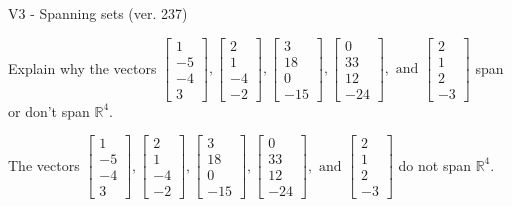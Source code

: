 \begin{exercise}
  \begin{exerciseTitle}V3 - Spanning sets (ver. 237)\end{exerciseTitle}
  \begin{exerciseStatement}
    Explain why the vectors \(\left[\begin{array}{r}
1 \\
-5 \\
-4 \\
3
\end{array}\right] , \left[\begin{array}{r}
2 \\
1 \\
-4 \\
-2
\end{array}\right] , \left[\begin{array}{r}
3 \\
18 \\
0 \\
-15
\end{array}\right] , \left[\begin{array}{r}
0 \\
33 \\
12 \\
-24
\end{array}\right] , \text{ and } \left[\begin{array}{r}
2 \\
1 \\
2 \\
-3
\end{array}\right]\) span or don't span \(\mathbb{R}^4\). 
	


  \end{exerciseStatement}
  \begin{exerciseAnswer}
   The vectors \(\left[\begin{array}{r}
1 \\
-5 \\
-4 \\
3
\end{array}\right] , \left[\begin{array}{r}
2 \\
1 \\
-4 \\
-2
\end{array}\right] , \left[\begin{array}{r}
3 \\
18 \\
0 \\
-15
\end{array}\right] , \left[\begin{array}{r}
0 \\
33 \\
12 \\
-24
\end{array}\right] , \text{ and } \left[\begin{array}{r}
2 \\
1 \\
2 \\
-3
\end{array}\right]\) 
  	 do not  
	span \(\mathbb{R}^4\).
  



\end{exerciseAnswer}
\end{exercise}
